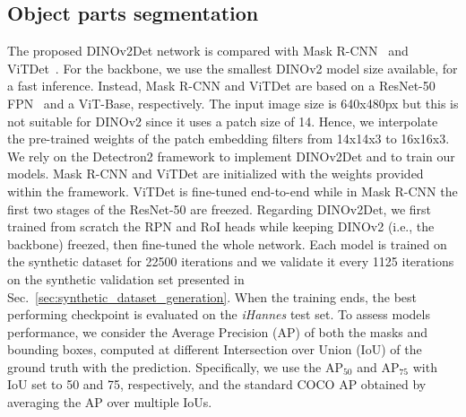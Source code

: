 \subsection{Object parts segmentation}
\label{sec:exp_object_parts_segmentation}
The proposed DINOv2Det network is compared with Mask R-CNN~\cite{he2017} and ViTDet~\cite{li2022}. For the backbone, we use the smallest DINOv2 model size available, for a fast inference. Instead, Mask R-CNN and ViTDet are based on a ResNet-50 FPN~\cite{lin2017} and a ViT-Base, respectively. The input image size is 640x480px but this is not suitable for DINOv2 since it uses a patch size of 14. Hence, we interpolate the pre-trained weights of the patch embedding filters from 14x14x3 to 16x16x3. We rely on the Detectron2 framework to implement DINOv2Det and to train our models. Mask R-CNN and ViTDet are initialized with the weights provided within the framework. ViTDet is fine-tuned end-to-end while in Mask R-CNN the first two stages of the ResNet-50 are freezed. Regarding DINOv2Det, we first trained from scratch the RPN and RoI heads while keeping DINOv2 (i.e., the backbone) freezed, then fine-tuned the whole network. 
Each model is trained on the synthetic dataset for 22500 iterations 
and we validate it every 1125 iterations on the synthetic validation set presented in Sec.~\ref{sec:synthetic_dataset_generation}. When the training ends, the best performing checkpoint is evaluated on the \textit{iHannes} test set. To assess models performance, we consider the Average Precision (AP) of both the masks and bounding boxes, computed at different Intersection over Union (IoU) of the ground truth with the prediction. Specifically, we use the AP$_{50}$ and AP$_{75}$ with IoU set to 50 and 75, respectively, and the standard COCO AP obtained by averaging the AP over multiple IoUs.
